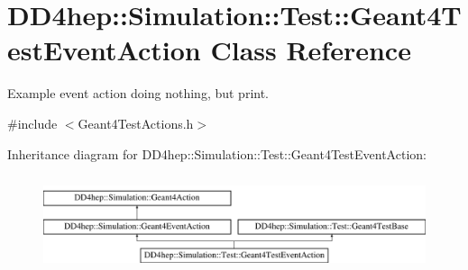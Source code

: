 \hypertarget{class_d_d4hep_1_1_simulation_1_1_test_1_1_geant4_test_event_action}{}\section{D\+D4hep\+:\+:Simulation\+:\+:Test\+:\+:Geant4\+Test\+Event\+Action Class Reference}
\label{class_d_d4hep_1_1_simulation_1_1_test_1_1_geant4_test_event_action}


Example event action doing nothing, but print.  




{\ttfamily \#include $<$Geant4\+Test\+Actions.\+h$>$}

Inheritance diagram for D\+D4hep\+:\+:Simulation\+:\+:Test\+:\+:Geant4\+Test\+Event\+Action\+:\begin{figure}[H]
\begin{center}
\leavevmode
\includegraphics[height=2.847458cm]{class_d_d4hep_1_1_simulation_1_1_test_1_1_geant4_test_event_action}
\end{center}
\end{figure}
